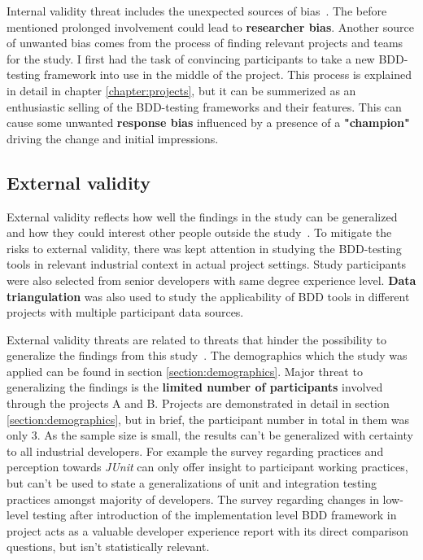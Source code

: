 Internal validity threat includes the unexpected sources of bias~\cite{kitchenham2002preliminary}. The before mentioned
prolonged involvement could lead to \textbf{researcher bias}.
Another source of unwanted bias comes from the process of finding relevant projects and teams for the study.
I first had the task of convincing participants to take a new BDD-testing framework into use in the middle of the
project. This process is explained in detail in chapter \ref{chapter:projects}, but it can be summerized as an enthusiastic selling of the
BDD-testing frameworks and their features. This can cause some unwanted \textbf{response bias} influenced by a presence
of a \textbf{"champion"}~\cite{kitchenham2002preliminary} driving the change and initial impressions.

\subsection{External validity}
External validity reflects how well the findings in the study can be generalized and how they could interest other people
outside the study~\cite{runeson2012case}. To mitigate the risks to external validity, there was kept attention in
studying the BDD-testing tools in relevant industrial context in actual project settings. Study participants were also selected from senior
developers with same degree experience level. \textbf{Data triangulation} was also used to study the applicability of BDD
tools in different projects with multiple participant data sources.

External validity threats are related to threats that hinder the possibility to generalize the findings from this study~\cite{runeson2012case}.
The demographics which the study was applied can be found in section \ref{section:demographics}. Major threat to generalizing the findings
is the \textbf{limited number of participants} involved through the projects A and B. Projects are demonstrated in detail in section \ref{section:demographics},
but in brief, the participant number in total in them was only 3. As the sample size is small, the results can't be generalized
with certainty to all industrial developers. For example the survey regarding practices and perception towards \textit{JUnit} can
only offer insight to participant working practices, but can't be used to state a generalizations of unit and integration
testing practices amongst majority of developers.
The survey regarding changes in low-level testing after introduction of the implementation level BDD framework in project acts
as a valuable developer experience report with its direct comparison questions, but isn't statistically relevant.

